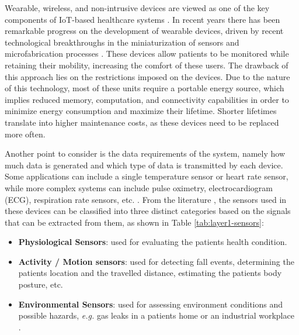 Wearable, wireless, and non-intrusive devices are viewed as one of the key components of \acs{IoT}-based healthcare systems \cite{Baker2017}. In recent years there has been remarkable progress on the development of wearable devices, driven by recent technological breakthroughs in the miniaturization of sensors and microfabrication processes \cite{Adame2018, Catarinucci2015}. These devices allow patients to be monitored while retaining their mobility, increasing the comfort of these users. The drawback of this approach lies on the restrictions imposed on the devices. Due to the nature of this technology, most of these units require a portable energy source, which implies reduced memory, computation, and connectivity capabilities in order to minimize energy consumption and maximize their lifetime. Shorter lifetimes translate into higher maintenance costs, as these devices need to be replaced more often. \bigskip

Another point to consider is the data requirements of the system, namely how much data is generated and which type of data is transmitted by each device. Some applications can include a single temperature sensor or heart rate sensor, while more complex systems can include pulse oximetry, electrocardiogram (\acs{ECG}), respiration rate sensors, etc. \cite{Wu2020}. From the literature \cite{Wu2020, Wu2019, Adame2018, MinhDang2019}, the sensors used in these devices can be classified into three distinct categories based on the signals that can be extracted from them, as shown in Table \ref{tab:layer1-sensors}:

\begin{itemize}
    \item \textbf{Physiological Sensors}: used for evaluating the patients health condition.
    \item \textbf{Activity / Motion sensors}: used for detecting fall events, determining the patients location and the travelled distance, estimating the patients body posture, etc.
    \item \textbf{Environmental Sensors}: used for assessing environment conditions and possible hazards, \textit{e.g.} gas leaks in a patients home or an industrial workplace \cite{Wu2019}.
\end{itemize}

